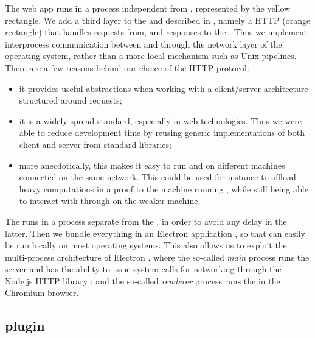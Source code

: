 The  web app runs in a process independent from , represented by the
yellow  rectangle. We add a third layer to the
 and  described in , namely a
HTTP  (orange rectangle) that handles requests from, and
responses to the  . Thus we implement interprocess
communication between  and  through the network layer of the operating
system, rather than a more local mechanism such as Unix pipelines. There are a
few reasons behind our choice of the HTTP protocol:
\begin{itemize}
  \item it provides useful abstractions when working with a client/server
    architecture structured around requests;
  \item it is a widely spread standard, especially in web technologies. Thus we
    were able to reduce development time by reusing generic implementations of
    both client and server from standard libraries;
  \item more anecdotically, this makes it easy to run  and  on
    different machines connected on the same network. This could be used for
    instance to offload heavy computations in a proof to the machine running
    , while still being able to interact with  through  on the
    weaker machine.
\end{itemize}
The  runs in a process separate from the , in
order to avoid any delay in the latter. Then we bundle everything in an Electron
application , so that  can easily be run locally on
most operating systems. This also allows us to exploit the multi-process
architecture of Electron , where the so-called
\emph{main} process runs the server and has the ability to issue system calls
for networking through the Node.js HTTP library ; and the
so-called \emph{renderer} process runs the  in the Chromium
browser.

\subsection{ plugin}

